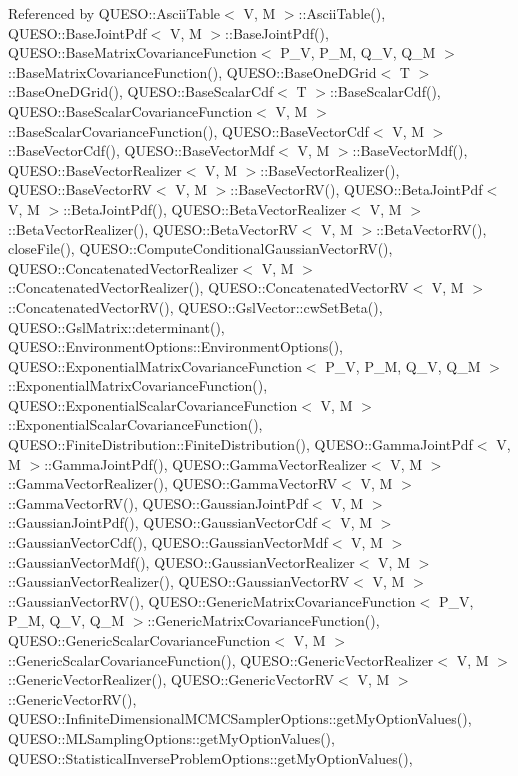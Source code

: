 Referenced by Q\-U\-E\-S\-O\-::\-Ascii\-Table$<$ V, M $>$\-::\-Ascii\-Table(), Q\-U\-E\-S\-O\-::\-Base\-Joint\-Pdf$<$ V, M $>$\-::\-Base\-Joint\-Pdf(), Q\-U\-E\-S\-O\-::\-Base\-Matrix\-Covariance\-Function$<$ P\-\_\-\-V, P\-\_\-\-M, Q\-\_\-\-V, Q\-\_\-\-M $>$\-::\-Base\-Matrix\-Covariance\-Function(), Q\-U\-E\-S\-O\-::\-Base\-One\-D\-Grid$<$ T $>$\-::\-Base\-One\-D\-Grid(), Q\-U\-E\-S\-O\-::\-Base\-Scalar\-Cdf$<$ T $>$\-::\-Base\-Scalar\-Cdf(), Q\-U\-E\-S\-O\-::\-Base\-Scalar\-Covariance\-Function$<$ V, M $>$\-::\-Base\-Scalar\-Covariance\-Function(), Q\-U\-E\-S\-O\-::\-Base\-Vector\-Cdf$<$ V, M $>$\-::\-Base\-Vector\-Cdf(), Q\-U\-E\-S\-O\-::\-Base\-Vector\-Mdf$<$ V, M $>$\-::\-Base\-Vector\-Mdf(), Q\-U\-E\-S\-O\-::\-Base\-Vector\-Realizer$<$ V, M $>$\-::\-Base\-Vector\-Realizer(), Q\-U\-E\-S\-O\-::\-Base\-Vector\-R\-V$<$ V, M $>$\-::\-Base\-Vector\-R\-V(), Q\-U\-E\-S\-O\-::\-Beta\-Joint\-Pdf$<$ V, M $>$\-::\-Beta\-Joint\-Pdf(), Q\-U\-E\-S\-O\-::\-Beta\-Vector\-Realizer$<$ V, M $>$\-::\-Beta\-Vector\-Realizer(), Q\-U\-E\-S\-O\-::\-Beta\-Vector\-R\-V$<$ V, M $>$\-::\-Beta\-Vector\-R\-V(), close\-File(), Q\-U\-E\-S\-O\-::\-Compute\-Conditional\-Gaussian\-Vector\-R\-V(), Q\-U\-E\-S\-O\-::\-Concatenated\-Vector\-Realizer$<$ V, M $>$\-::\-Concatenated\-Vector\-Realizer(), Q\-U\-E\-S\-O\-::\-Concatenated\-Vector\-R\-V$<$ V, M $>$\-::\-Concatenated\-Vector\-R\-V(), Q\-U\-E\-S\-O\-::\-Gsl\-Vector\-::cw\-Set\-Beta(), Q\-U\-E\-S\-O\-::\-Gsl\-Matrix\-::determinant(), Q\-U\-E\-S\-O\-::\-Environment\-Options\-::\-Environment\-Options(), Q\-U\-E\-S\-O\-::\-Exponential\-Matrix\-Covariance\-Function$<$ P\-\_\-\-V, P\-\_\-\-M, Q\-\_\-\-V, Q\-\_\-\-M $>$\-::\-Exponential\-Matrix\-Covariance\-Function(), Q\-U\-E\-S\-O\-::\-Exponential\-Scalar\-Covariance\-Function$<$ V, M $>$\-::\-Exponential\-Scalar\-Covariance\-Function(), Q\-U\-E\-S\-O\-::\-Finite\-Distribution\-::\-Finite\-Distribution(), Q\-U\-E\-S\-O\-::\-Gamma\-Joint\-Pdf$<$ V, M $>$\-::\-Gamma\-Joint\-Pdf(), Q\-U\-E\-S\-O\-::\-Gamma\-Vector\-Realizer$<$ V, M $>$\-::\-Gamma\-Vector\-Realizer(), Q\-U\-E\-S\-O\-::\-Gamma\-Vector\-R\-V$<$ V, M $>$\-::\-Gamma\-Vector\-R\-V(), Q\-U\-E\-S\-O\-::\-Gaussian\-Joint\-Pdf$<$ V, M $>$\-::\-Gaussian\-Joint\-Pdf(), Q\-U\-E\-S\-O\-::\-Gaussian\-Vector\-Cdf$<$ V, M $>$\-::\-Gaussian\-Vector\-Cdf(), Q\-U\-E\-S\-O\-::\-Gaussian\-Vector\-Mdf$<$ V, M $>$\-::\-Gaussian\-Vector\-Mdf(), Q\-U\-E\-S\-O\-::\-Gaussian\-Vector\-Realizer$<$ V, M $>$\-::\-Gaussian\-Vector\-Realizer(), Q\-U\-E\-S\-O\-::\-Gaussian\-Vector\-R\-V$<$ V, M $>$\-::\-Gaussian\-Vector\-R\-V(), Q\-U\-E\-S\-O\-::\-Generic\-Matrix\-Covariance\-Function$<$ P\-\_\-\-V, P\-\_\-\-M, Q\-\_\-\-V, Q\-\_\-\-M $>$\-::\-Generic\-Matrix\-Covariance\-Function(), Q\-U\-E\-S\-O\-::\-Generic\-Scalar\-Covariance\-Function$<$ V, M $>$\-::\-Generic\-Scalar\-Covariance\-Function(), Q\-U\-E\-S\-O\-::\-Generic\-Vector\-Realizer$<$ V, M $>$\-::\-Generic\-Vector\-Realizer(), Q\-U\-E\-S\-O\-::\-Generic\-Vector\-R\-V$<$ V, M $>$\-::\-Generic\-Vector\-R\-V(), Q\-U\-E\-S\-O\-::\-Infinite\-Dimensional\-M\-C\-M\-C\-Sampler\-Options\-::get\-My\-Option\-Values(), Q\-U\-E\-S\-O\-::\-M\-L\-Sampling\-Options\-::get\-My\-Option\-Values(), Q\-U\-E\-S\-O\-::\-Statistical\-Inverse\-Problem\-Options\-::get\-My\-Option\-Values(), 